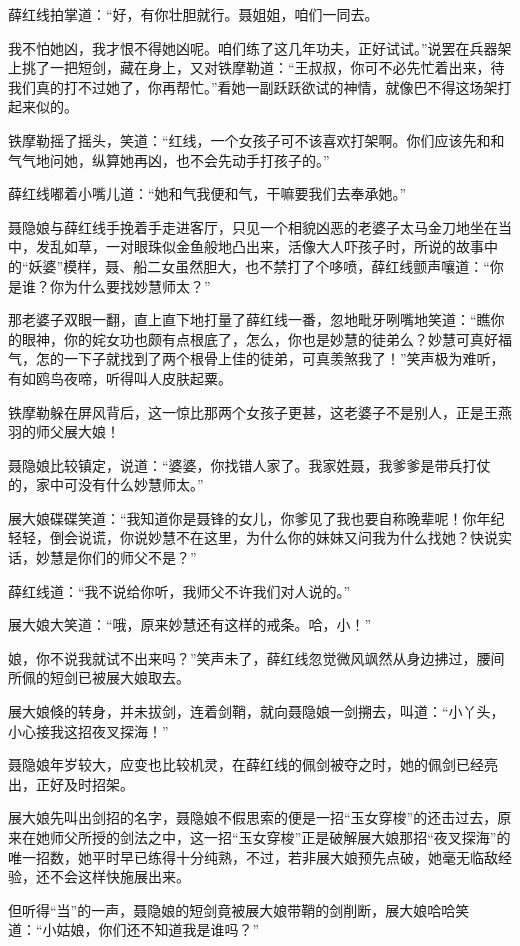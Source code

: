 \documentclass[12pt,oneside]{book}
\begin{document}
薛红线拍掌道：``好，有你壮胆就行。聂姐姐，咱们一同去。

我不怕她凶，我才恨不得她凶呢。咱们练了这几年功夫，正好试试。''说罢在兵器架上挑了一把短剑，藏在身上，又对铁摩勒道：``王叔叔，你可不必先忙着出来，待我们真的打不过她了，你再帮忙。''看她一副跃跃欲试的神情，就像巴不得这场架打起来似的。

铁摩勒摇了摇头，笑道：``红线，一个女孩子可不该喜欢打架啊。你们应该先和和气气地问她，纵算她再凶，也不会先动手打孩子的。''

薛红线嘟着小嘴儿道：``她和气我便和气，干嘛要我们去奉承她。''

聂隐娘与薛红线手挽着手走进客厅，只见一个相貌凶恶的老婆子太马金刀地坐在当中，发乱如草，一对眼珠似金鱼般地凸出来，活像大人吓孩子时，所说的故事中的``妖婆''模样，聂、船二女虽然胆大，也不禁打了个哆喷，薛红线颤声嚷道：``你是谁？你为什么要找妙慧师太？''

那老婆子双眼一翻，直上直下地打量了薛红线一番，忽地毗牙咧嘴地笑道：``瞧你的眼神，你的姹女功也颇有点根底了，怎么，你也是妙慧的徒弟么？妙慧可真好福气，怎的一下子就找到了两个根骨上佳的徒弟，可真羡煞我了！''笑声极为难听，有如鸥鸟夜啼，听得叫人皮肤起粟。

铁摩勒躲在屏风背后，这一惊比那两个女孩子更甚，这老婆子不是别人，正是王燕羽的师父展大娘！

聂隐娘比较镇定，说道：``婆婆，你找错人家了。我家姓聂，我爹爹是带兵打仗的，家中可没有什么妙慧师太。''

展大娘碟碟笑道：``我知道你是聂锋的女儿，你爹见了我也要自称晚辈呢！你年纪轻轻，倒会说谎，你说妙慧不在这里，为什么你的妹妹又问我为什么找她？快说实话，妙慧是你们的师父不是？''

薛红线道：``我不说给你听，我师父不许我们对人说的。''

展大娘大笑道：``哦，原来妙慧还有这样的戒条。哈，小！''

娘，你不说我就试不出来吗？''笑声未了，薛红线忽觉微风飒然从身边拂过，腰间所佩的短剑已被展大娘取去。

展大娘倏的转身，并未拔剑，连着剑鞘，就向聂隐娘一剑搠去，叫道：``小丫头，小心接我这招夜叉探海！''

聂隐娘年岁较大，应变也比较机灵，在薛红线的佩剑被夺之时，她的佩剑已经亮出，正好及时招架。

展大娘先叫出剑招的名字，聂隐娘不假思索的便是一招``玉女穿梭''的还击过去，原来在她师父所授的剑法之中，这一招``玉女穿梭''正是破解展大娘那招``夜叉探海''的唯一招数，她平时早已练得十分纯熟，不过，若非展大娘预先点破，她毫无临敌经验，还不会这样快施展出来。

但听得``当''的一声，聂隐娘的短剑竟被展大娘带鞘的剑削断，展大娘哈哈笑道：``小姑娘，你们还不知道我是谁吗？''
\end{document}
